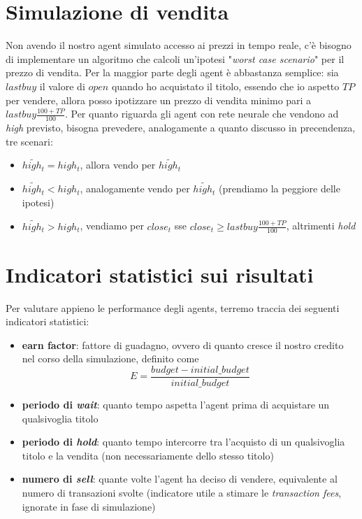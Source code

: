 \documentclass[binding=0.6cm]{sapthesis}
\begin{document}
		\section{Simulazione di vendita}
			Non avendo il nostro agent simulato accesso ai prezzi in tempo reale, c'è bisogno di implementare un algoritmo che calcoli un'ipotesi "\textit{worst case scenario}" per il prezzo di vendita.
			Per la maggior parte degli agent è abbastanza semplice: sia $lastbuy$ il valore di $open$ quando ho acquistato il titolo, essendo che io aspetto $TP$ per vendere, allora posso ipotizzare un prezzo
			di vendita minimo pari a $lastbuy \frac{100 + TP}{100}$. Per quanto riguarda gli agent con rete neurale che vendono ad \textit{high} previsto, bisogna prevedere, analogamente a quanto discusso in
			precendenza, tre scenari:
			\begin{itemize}
				\item $\tilde{high_t} = high_t$, allora vendo per $\tilde{high_t}$
				\item $\tilde{high_t} < high_t$, analogamente vendo per $\tilde{high_t}$ (prendiamo la peggiore delle ipotesi)
				\item $\tilde{high_t} > high_t$, vendiamo per $close_t$ sse $close_t \geq lastbuy \frac{100 + TP}{100}$, altrimenti \textit{hold}
			\end{itemize}
		\section{Indicatori statistici sui risultati}
			Per valutare appieno le performance degli agents, terremo traccia dei seguenti indicatori statistici:
			\begin{itemize}
				\item \textbf{earn factor}: fattore di guadagno, ovvero di quanto cresce il nostro credito nel corso della simulazione, definito come
					\[ E = \frac{budget - initial\_budget}{initial\_budget} \]
				\item \textbf{periodo di \textit{wait}}: quanto tempo aspetta l'agent prima di acquistare un qualsivoglia titolo
				\item \textbf{periodo di \textit{hold}}: quanto tempo intercorre tra l'acquisto di un qualsivoglia titolo e la vendita (non necessariamente dello stesso titolo)
				\item \textbf{numero di \textit{sell}}: quante volte l'agent ha deciso di vendere, equivalente al numero di transazioni svolte (indicatore utile a stimare le \textit{transaction fees}, ignorate in
					fase di simulazione)
			\end{itemize}
\end{document}
